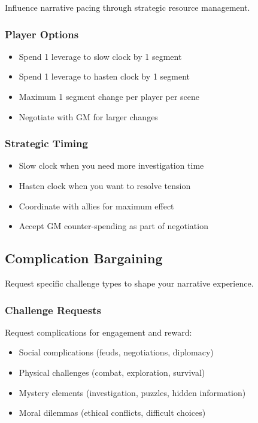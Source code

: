 Influence narrative pacing through strategic resource management.

\subsubsection{Player Options}

\begin{itemize}
\item Spend 1 leverage to slow clock by 1 segment
\item Spend 1 leverage to hasten clock by 1 segment
\item Maximum 1 segment change per player per scene
\item Negotiate with GM for larger changes
\end{itemize}

\subsubsection{Strategic Timing}

\begin{itemize}
\item Slow clock when you need more investigation time
\item Hasten clock when you want to resolve tension
\item Coordinate with allies for maximum effect
\item Accept GM counter-spending as part of negotiation
\end{itemize}

\subsection{Complication Bargaining}

Request specific challenge types to shape your narrative experience.

\subsubsection{Challenge Requests}

Request complications for engagement and reward:
\begin{itemize}
\item Social complications (feuds, negotiations, diplomacy)
\item Physical challenges (combat, exploration, survival)
\item Mystery elements (investigation, puzzles, hidden information)
\item Moral dilemmas (ethical conflicts, difficult choices)
\end{itemize}

